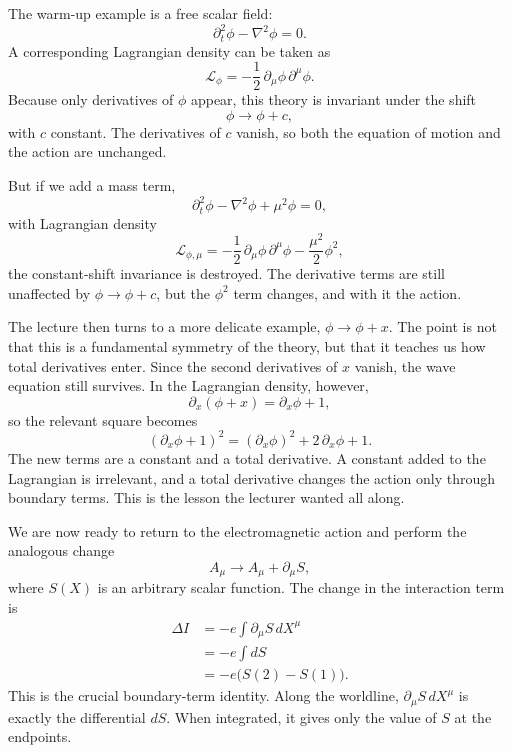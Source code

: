 The warm-up example is a free scalar field:
\begin{equation}
\partial_t^2\phi-\nabla^2\phi=0.
\end{equation}
A corresponding Lagrangian density can be taken as
\begin{equation}
\mathcal L_\phi=-\frac12\,\partial_\mu\phi\,\partial^\mu\phi.
\end{equation}
Because only derivatives of \(\phi\) appear, this theory is invariant under the shift
\begin{equation}
\phi\longrightarrow \phi+c,
\end{equation}
with \(c\) constant. The derivatives of \(c\) vanish, so both the equation of motion and the action are unchanged.

But if we add a mass term,
\begin{equation}
\partial_t^2\phi-\nabla^2\phi+\mu^2\phi=0,
\end{equation}
with Lagrangian density
\begin{equation}
\mathcal L_{\phi,\mu}
=
-\frac12\,\partial_\mu\phi\,\partial^\mu\phi
-\frac{\mu^2}{2}\phi^2,
\end{equation}
the constant-shift invariance is destroyed. The derivative terms are still unaffected by \(\phi\to\phi+c\), but the \(\phi^2\) term changes, and with it the action.

The lecture then turns to a more delicate example, \(\phi\to\phi+x\). The point is not that this is a fundamental symmetry of the theory, but that it teaches us how total derivatives enter. Since the second derivatives of \(x\) vanish, the wave equation still survives. In the Lagrangian density, however,
\begin{equation}
\partial_x(\phi+x)=\partial_x\phi+1,
\end{equation}
so the relevant square becomes
\begin{equation}
(\partial_x\phi+1)^2
=
(\partial_x\phi)^2+2\,\partial_x\phi+1.
\end{equation}
The new terms are a constant and a total derivative. A constant added to the Lagrangian is irrelevant, and a total derivative changes the action only through boundary terms. This is the lesson the lecturer wanted all along.

We are now ready to return to the electromagnetic action and perform the analogous change
\begin{equation}
A_\mu \longrightarrow A_\mu+\partial_\mu S,
\end{equation}
where \(S(X)\) is an arbitrary scalar function. The change in the interaction term is
\begin{align}
\Delta I
&=
-e\int \partial_\mu S\,dX^\mu \\
&=
-e\int dS \\
&=
-e\bigl(S(2)-S(1)\bigr).
\end{align}
This is the crucial boundary-term identity. Along the worldline, \(\partial_\mu S\,dX^\mu\) is exactly the differential \(dS\). When integrated, it gives only the value of \(S\) at the endpoints.


